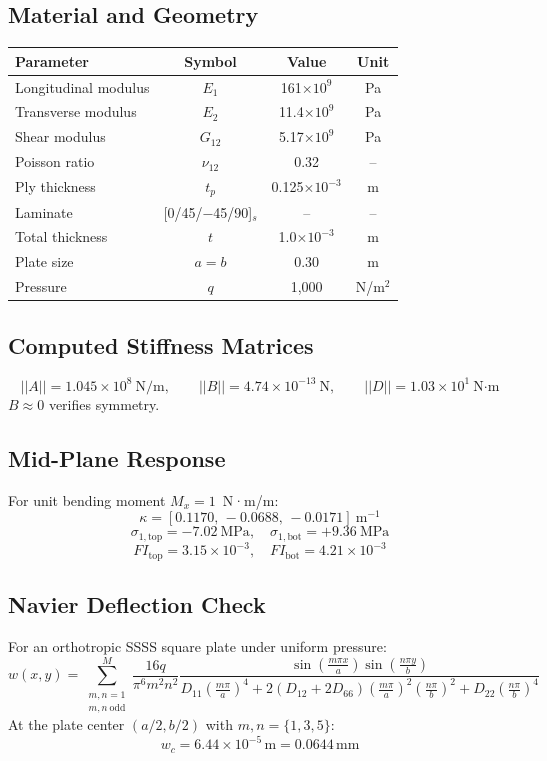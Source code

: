 \documentclass[12pt,a4paper]{article}
\begin{document}
\subsection{Material and Geometry}
\begin{center}
\begin{tabular}{lccc}
\toprule
Parameter & Symbol & Value & Unit\\
\midrule
Longitudinal modulus & $E_1$ & 161$\times10^9$ & Pa\\
Transverse modulus & $E_2$ & 11.4$\times10^9$ & Pa\\
Shear modulus & $G_{12}$ & 5.17$\times10^9$ & Pa\\
Poisson ratio & $\nu_{12}$ & 0.32 & --\\
Ply thickness & $t_p$ & 0.125$\times10^{-3}$ & m\\
Laminate & [0/45/−45/90]$_s$ & -- & --\\
Total thickness & $t$ & 1.0$\times10^{-3}$ & m\\
Plate size & $a=b$ & 0.30 & m\\
Pressure & $q$ & 1,000 & N/m$^2$\\
\bottomrule
\end{tabular}
\end{center}

\subsection{Computed Stiffness Matrices}
\[
||A|| = 1.045\times10^8~\text{N/m},\qquad
||B|| = 4.74\times10^{-13}~\text{N},\qquad
||D|| = 1.03\times10^1~\text{N·m}
\]
$B\!\approx\!0$ verifies symmetry.

\subsection{Mid-Plane Response}
For unit bending moment $M_x=1$~N·m/m:
\[
\kappa = [0.1170,\,-0.0688,\,-0.0171]~\text{m}^{-1}
\]
\[
\sigma_{1,\text{top}}=-7.02~\text{MPa},\quad
\sigma_{1,\text{bot}}=+9.36~\text{MPa}
\]
\[
FI_\text{top}=3.15\times10^{-3},\quad
FI_\text{bot}=4.21\times10^{-3}
\]

\subsection{Navier Deflection Check}
For an orthotropic SSSS square plate under uniform pressure:
\begin{equation}
w(x,y)=
\sum_{\substack{m,n=1\\m,n~\text{odd}}}^{M}
\frac{16q}{\pi^6 m^2 n^2}
\frac{\sin(\tfrac{m\pi x}{a})\sin(\tfrac{n\pi y}{b})}
{D_{11}(\tfrac{m\pi}{a})^4
+2(D_{12}+2D_{66})(\tfrac{m\pi}{a})^2(\tfrac{n\pi}{b})^2
+D_{22}(\tfrac{n\pi}{b})^4}
\end{equation}
At the plate center $(a/2,b/2)$ with $m,n=\{1,3,5\}$:
\[
w_c = 6.44\times10^{-5}\,\text{m} = 0.0644\,\text{mm}
\]
\end{document}
